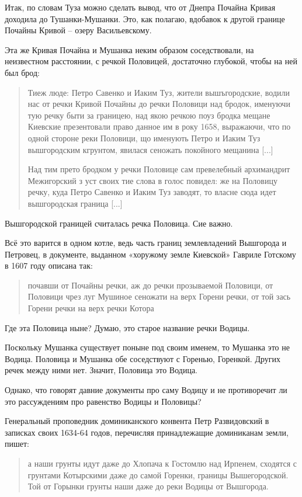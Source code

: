 Итак, по словам Туза можно сделать вывод, что от Днепра Почайна Кривая доходила до Тушанки-Мушанки. Это, как полагаю, вдобавок к другой границе Почайны Кривой – озеру Васильевскому.

Эта же Кривая Почайна и Мушанка неким образом соседствовали, на неизвестном расстоянии, с речкой Половицей, достаточно глубокой, чтобы на ней был брод:

\begin{quotation}
Тиеж люде: Петро Савенко и Иаким Туз, жители вышъгородские, водили нас от речки Кривой Почайны до речки Половици над бродок, именуючи тую речку быти за границею, над якою речкою поуз бродка мещане Киевские презентовали право данное им в року 1658, выражаючи, что по одной стороне реки Половици, що именують Петро и Иаким Туз вышгородским кгрунтом, явилася сеножать покойного мещанина [...]

Над тим прето бродком у речки Половице сам превелебный архимандрит Межигорский з уст своих тие слова в голос повидел: же на Половицу речку, куда Петро Савенко и Иаким Туз заводят, то власне сюда идет вышгородская граница [...]
\end{quotation}

Вышгородской границей считалась речка Половица. Сие важно.

Всё это варится в одном котле, ведь часть границ землевладений Вышгорода и Петровец, в документе, выданном «хоружому земле Киевской» Гавриле Готскому в 1607 году описана так:

\begin{quotation}
почавши от Почайны речки, аж до речки прозываемой Половици, от Половици чрез луг Мушиное сеножати на верх Горени речки, от той зась Горени речки на верх речки Котора
\end{quotation}

Где эта Половица ныне? Думаю, это старое название речки Водицы. 

Поскольку Мушанка существует поныне под своим именем, то Мушанка это не Водица. Половица и Мушанка обе соседствуют с Горенью, Горенкой. Других речек между ними нет. Значит, Половица это Водица.

Однако, что говорят давние документы про саму Водицу и не противоречит ли это рассуждениям про равенство Водицы и Половицы?

Генеральный проповедник доминиканского конвента Петр Развидовский в записках своих 1634-64 годов, перечисляя принадлежащие доминиканам земли, пишет:

\begin{quotation}
а наши грунты идут даже до Хлопача к Гостомлю над Ирпенем, сходятся с грунтами Котырскими даже до самой Горенки, границы Вышегородской. Той от Горынки грунты наши даже до реки Водицы от Вышгорода.
\end{quotation}

